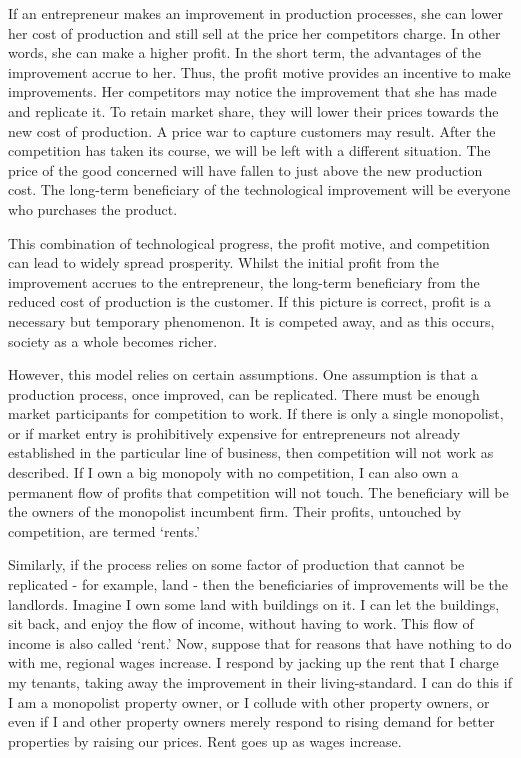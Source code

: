 \documentclass[]{tufte-handout}
\begin{document}
If an entrepreneur makes an improvement in production processes, she can
lower her cost of production and still sell at the price her competitors
charge. In other words, she can make a higher profit. In the short term,
the advantages of the improvement accrue to her. Thus, the profit motive
provides an incentive to make improvements. Her competitors may notice
the improvement that she has made and replicate it. To retain market
share, they will lower their prices towards the new cost of production.
A price war to capture customers may result. After the competition has
taken its course, we will be left with a different situation. The price
of the good concerned will have fallen to just above the new production
cost. The long-term beneficiary of the technological improvement will be
everyone who purchases the product.

This combination of technological progress, the profit motive, and
competition can lead to widely spread prosperity. Whilst the initial
profit from the improvement accrues to the entrepreneur, the long-term
beneficiary from the reduced cost of production is the customer. If this
picture is correct, profit is a necessary but temporary phenomenon. It
is competed away, and as this occurs, society as a whole becomes richer.

However, this model relies on certain assumptions. One assumption is
that a production process, once improved, can be replicated. There must
be enough market participants for competition to work. If there is only
a single monopolist, or if market entry is prohibitively expensive for
entrepreneurs not already established in the particular line of
business, then competition will not work as described. If I own a big
monopoly with no competition, I can also own a permanent flow of profits
that competition will not touch. The beneficiary will be the owners of
the monopolist incumbent firm. Their profits, untouched by competition,
are termed `rents.'

Similarly, if the process relies on some factor of production that
cannot be replicated - for example, land - then the beneficiaries of
improvements will be the landlords. Imagine I own some land with
buildings on it. I can let the buildings, sit back, and enjoy the flow
of income, without having to work. This flow of income is also called
`rent.' Now, suppose that for reasons that have nothing to do with me,
regional wages increase. I respond by jacking up the rent that I charge
my tenants, taking away the improvement in their living-standard. I can
do this if I am a monopolist property owner, or I collude with other
property owners, or even if I and other property owners merely respond
to rising demand for better properties by raising our prices. Rent goes
up as wages increase.
\end{document}
